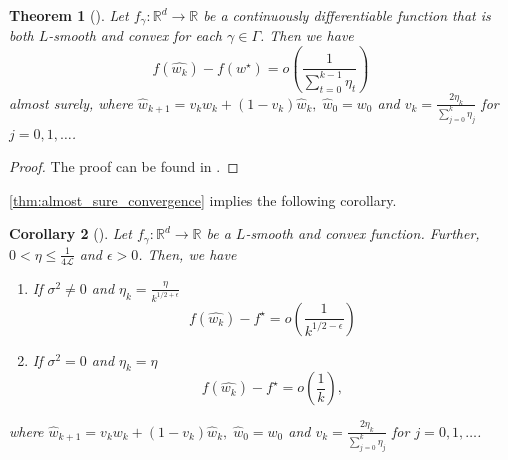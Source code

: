 \documentclass[12pt]{article}
\newtheorem{theorem}{Theorem}[section]
\newtheorem{corollary}[theorem]{Corollary}
\theoremstyle{definition}
\newtheorem{assumption}[assumption]{Assumption}
\numberwithin{equation}{section}
\newcommand{\R}{\mathbb{R}}
\newcommand{\CL}{\mathcal{L}}
\begin{document}
\begin{theorem}[]
  \label{thm:almost_sure_convergence}
  Let $f_{\gamma} : \R^d \rightarrow \R$ be a continuously differentiable function that is both $L$-smooth and convex for each $\gamma \in \Gamma$. Then we have 
  \begin{equation*}
    f(\widehat{w_{k}}) - f(w^\star) = o\left(\frac{1}{\sum_{t=0}^{k-1}\eta_t}\right)
  \end{equation*}
  almost surely, where $\widehat{w}_{k+1} = v_k w_k + (1-v_k)\widehat{w}_k, \; \widehat{w}_0 = w_0$ and $v_k = \frac{2\eta_k}{\sum_{j=0}^k\eta_j}$ for $j=0,1,\dots$.
\end{theorem}
\begin{proof}
  The proof can be found in \autocite{sebbouhAlmostSureConvergence2021}.
\end{proof}
\autoref{thm:almost_sure_convergence} implies the following corollary.
\begin{corollary}[]
  Let $f_{\gamma}: \R^d \rightarrow \R$ be a $L$-smooth and convex function. Further, $0 < \eta \leq \frac{1}{4\CL}$ and $\epsilon > 0 $. Then, we have
  \begin{enumerate}
    \item If $\sigma^2 \neq 0$ and $\eta_k = \frac{\eta}{k^{1/2+\epsilon}}$
    \begin{equation*}
      f(\widehat{w_{k}}) - f^\star = o\left(\frac{1}{k^{1/2-\epsilon}}\right)
    \end{equation*}
    \item If $\sigma^2 = 0$ and $\eta_k = \eta$
    \begin{equation*}
      f(\widehat{w_{k}}) - f^\star = o\left(\frac{1}{k}\right),
    \end{equation*}
  \end{enumerate}
  where $\widehat{w}_{k+1} = v_k w_k + (1-v_k)\widehat{w}_k, \; \widehat{w}_0 = w_0$ and $v_k = \frac{2\eta_k}{\sum_{j=0}^k\eta_j}$ for $j=0,1,\dots$.
\end{corollary}
\end{document}
